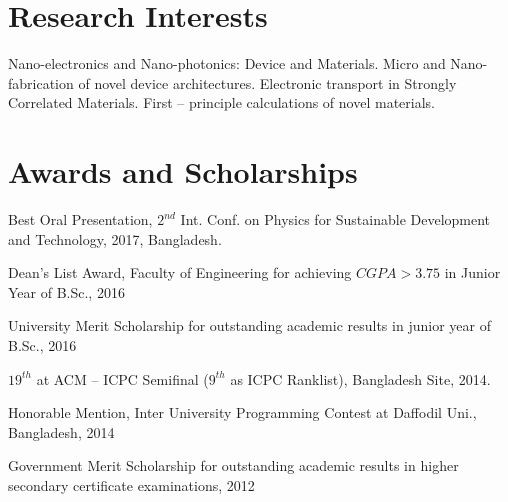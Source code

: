 \documentclass[a4paper,20pt]{article}
\begin{document}
	 
\vspace{0pt}
\section{Research Interests}
	Nano-electronics and Nano-photonics: Device and Materials. Micro and Nano-fabrication of novel device architectures. Electronic transport in Strongly Correlated Materials. First – principle calculations of novel materials.\\

\vspace{0pt}
\section{Awards and Scholarships}
	\begin{description}[font=$\bullet$]
		\item{Best Oral Presentation, $2^{nd}$ Int. Conf. on Physics for Sustainable Development and Technology, 2017, Bangladesh.}
		\vspace{-5pt}
		\item {Dean's List Award, Faculty of Engineering for achieving $CGPA>3.75$ in Junior Year of B.Sc., 2016}
		\vspace{-5pt}
		\item {University Merit Scholarship for outstanding academic results in junior year of B.Sc., 2016}
		\vspace{-5pt}
		\item {$19^{th}$ at ACM – ICPC Semifinal ($9^{th}$ as ICPC Ranklist), Bangladesh Site, 2014.}
		\vspace{-5pt}
		\item {Honorable Mention, Inter University Programming Contest at Daffodil Uni., Bangladesh, 2014}
		\vspace{-5pt}
		\item {Government Merit Scholarship for outstanding academic results in higher secondary certificate examinations, 2012}
\end{description}
\end{document}
